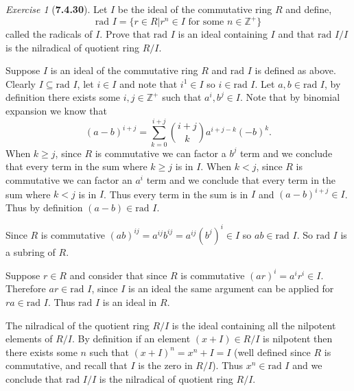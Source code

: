 \documentclass[12pt]{amsart}
\makeatletter
\theoremstyle{remark}
\newtheorem*{exercise}{Exercise}%
\def\ZZ{\ensuremath{\mathbb Z}}
\renewenvironment{proof}[1][\proofname]{\par\doublespacing
  \pushQED{\qed}%
  \normalfont \topsep6\p@\@plus6\p@\relax
  \list{}{%
    \settowidth{\leftmargin}{\itshape\proofname:\hskip\labelsep}%
    \setlength{\labelwidth}{0pt}%
    \setlength{\itemindent}{-\leftmargin}%
  }%
  \item[\hskip\labelsep\itshape#1\@addpunct{:}]\ignorespaces
}{%
  \popQED\endlist\@endpefalse
  \singlespacing
}
\theoremstyle{mycomment}
\makeatother
\begin{document}
\begin{exercise}[\textbf{7.4.30}] Let $I$ be the ideal of the commutative ring $R$ and define, 
  \begin{equation*}
    \text{rad }I = \{r \in R | r^n \in I \text{ for some } n \in \ZZ^{+} \}
  \end{equation*} 
  called the radicals of $I$. Prove that  $\text{rad }I$ is an ideal containing $I$ and that $\text{rad }I/I$ is the nilradical of quotient ring $R/I$.
  \begin{proof} Suppose $I$ is an ideal of the commutative ring $R$ and $\text{rad }I$ is defined as above. Clearly $I \subseteq  \text{rad }I$, 
    let $i \in I$ and note that $i ^1 \in I$ so $i \in  \text{rad }I$. Let $a, b \in \text{rad }I$, by definition there
    exists some $i, j \in \ZZ^{+}$ such that $a^i,b^j \in I$. Note that by binomial expansion we know that
    \begin{equation*}
      (a - b)^{i + j} = \sum_{k = 0}^{i + j} {i + j \choose k}a^{i + j - k}(-b)^k.
    \end{equation*}
    When $k\geq j$, since $R$ is commutative we can factor a $b^j$ term and we conclude that every term in the sum where 
    $k\geq j$ is in $I$. When $k < j$, since $R$ is commutative we can factor an $a^i$ term and we conclude that every term in the sum where 
    $k < j$ is in $I$. Thus every term in the sum is in $I$ and $(a - b)^{i + j} \in I$. Thus by definition $(a - b) \in \text{rad }I$.

    Since $R$ is commutative $(ab)^{ij} = a^{ij}b^{ij} = a^{ij}(b^{j})^i \in I$ so $ab \in \text{rad }I$. So $\text{rad }I$ is a subring of $R$.

    Suppose $r \in  R$ and consider that since $R$ is commutative $(ar)^i = a^ir^i \in I$. Therefore $ar \in  \text{rad }I$, since $I$ is an ideal the same argument can be applied for 
    $ra \in  \text{rad }I$. Thus $ \text{rad }I$ is an ideal in $R$.  

    The nilradical of the quotient ring $R/I$ is the ideal containing all the nilpotent elements of $R/I$. By definition if an element $(x + I)\in R/I$ 
    is nilpotent then there exists some $n$ such that $(x + I)^n = x^n + I = I$ (well defined since $R$ is commutative, and recall that $I$ is the zero in $R/I$).
    Thus $x^n \in \text{rad }I$ and we conclude that $\text{rad }I/I$ is the nilradical of quotient ring $R/I$.
  \end{proof}
\end{exercise}
\vspace{.5in}
\end{document}
